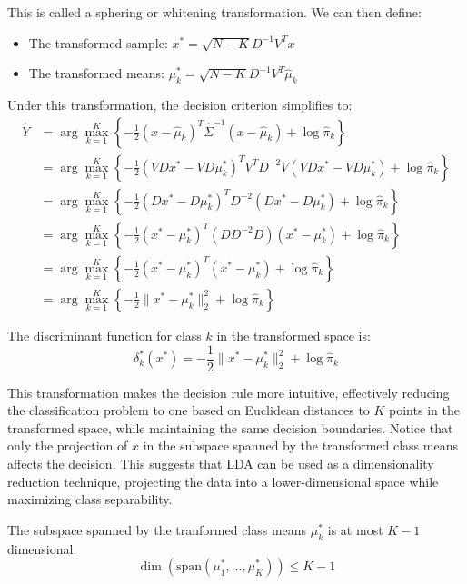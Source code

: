 This is called a sphering or whitening transformation. We can then define:
\begin{itemize}
    \item The transformed sample: $x^* = \sqrt{N-K}D^{-1}V^Tx$
    \item The transformed means: $\mu_k^* = \sqrt{N-K}D^{-1}V^T\hat{\mu}_k$
\end{itemize}

Under this transformation, the decision criterion simplifies to:
\begin{align*}
\hat{Y} &= \arg\max_{k=1}^K \left\{-\frac{1}{2}(x - \hat{\mu}_k)^T \hat{\Sigma}^{-1} (x - \hat{\mu}_k) + \log \hat{\pi}_k\right\} \\
&= \arg\max_{k=1}^K \left\{-\frac{1}{2}(V D x^* - V D \mu_k^*)^T V^T D^{-2} V (V D x^* - V D \mu_k^*) + \log \hat{\pi}_k\right\} \\
&= \arg\max_{k=1}^K \left\{-\frac{1}{2}(D x^* - D \mu_k^*)^T D^{-2} (D x^* - D \mu_k^*) + \log \hat{\pi}_k\right\} \\
&= \arg\max_{k=1}^K \left\{-\frac{1}{2}(x^* - \mu_k^*)^T (D D^{-2} D) (x^* - \mu_k^*) + \log \hat{\pi}_k\right\} \\
&= \arg\max_{k=1}^K \left\{-\frac{1}{2}(x^* - \mu_k^*)^T (x^* - \mu_k^*) + \log \hat{\pi}_k\right\} \\
&= \arg\max_{k=1}^K \left\{-\frac{1}{2}\|x^* - \mu_k^*\|_2^2 + \log \hat{\pi}_k\right\}
\end{align*}

\begin{definition}
The discriminant function for class $k$ in the transformed space is:
\[
\delta_k^*(x^*) = -\frac{1}{2}\|x^* - \mu_k^*\|_2^2 + \log \hat{\pi}_k
\]
\end{definition}

This transformation makes the decision rule more intuitive, effectively reducing the classification problem to one based on Euclidean distances to $K$ points in the transformed space, while maintaining the same decision boundaries. Notice that only the projection of $x$ in the subspace spanned by the transformed class means affects the decision. This suggests that LDA can be used as a dimensionality reduction technique, projecting the data into a lower-dimensional space while maximizing class separability.

\begin{theorem}
The subspace spanned by the tranformed class means $\mu_k^*$ is at most $K-1$ dimensional.
\[
\dim(\mathrm{span}(\mu_1^*, \ldots, \mu_K^*)) \leq K-1
\]
\end{theorem}


